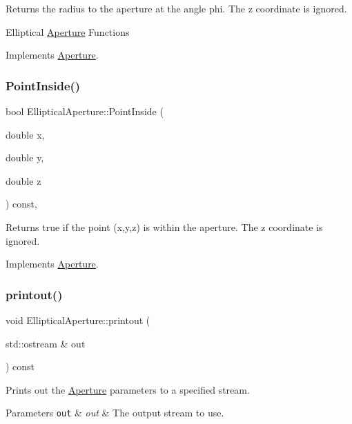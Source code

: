 Returns the radius to the aperture at the angle phi. The z coordinate is ignored.

Elliptical \hyperlink{classAperture}{Aperture} Functions 

Implements \hyperlink{classAperture_ad0ea7907d393ec1e6a8303343fe9dd29}{Aperture}.

\mbox{\label{classEllipticalAperture_ad2ac194f4f03d5e590a7640afa69ace9}} 
\subsubsection{\texorpdfstring{Point\+Inside()}{PointInside()}}
{\footnotesize\ttfamily bool Elliptical\+Aperture\+::\+Point\+Inside (\begin{DoxyParamCaption}\item[{double}]{x,  }\item[{double}]{y,  }\item[{double}]{z }\end{DoxyParamCaption}) const\hspace{0.3cm}{\ttfamily [inline]}, {\ttfamily [virtual]}}

Returns true if the point (x,y,z) is within the aperture. The z coordinate is ignored. 

Implements \hyperlink{classAperture_a77854d058bf8a00cfeb7a6d766dc0028}{Aperture}.

\mbox{\label{classEllipticalAperture_af45343465b84072027de770839bbd73d}} 
\subsubsection{\texorpdfstring{printout()}{printout()}}
{\footnotesize\ttfamily void Elliptical\+Aperture\+::printout (\begin{DoxyParamCaption}\item[{std\+::ostream \&}]{out }\end{DoxyParamCaption}) const\hspace{0.3cm}{\ttfamily [virtual]}}

Prints out the \hyperlink{classAperture}{Aperture} parameters to a specified stream. 
\begin{DoxyParams}[1]{Parameters}
\mbox{\tt out}  & {\em out} & The output stream to use. \\
\hline
\end{DoxyParams}


